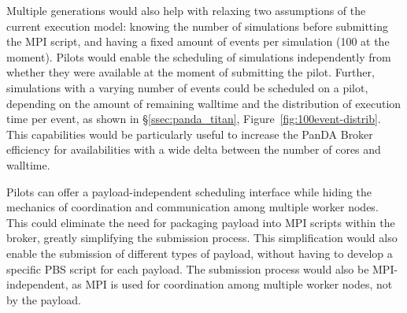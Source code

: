 Multiple generations would also help with relaxing two assumptions of the
current execution model: knowing the number of simulations before submitting the
MPI script, and having a fixed amount of events per simulation (100 at the
moment). Pilots would enable the scheduling of simulations independently from
whether they were available at the moment of submitting the pilot. Further,
simulations with a varying number of events could be scheduled on a pilot,
depending on the amount of remaining walltime and the distribution of execution
time per event, as shown in \S\ref{ssec:panda_titan},
Figure~\ref{fig:100event-distrib}. This capabilities would be particularly
useful to increase the PanDA Broker efficiency for availabilities with a wide
delta between the number of cores and walltime.



Pilots can offer a payload-independent scheduling interface while hiding the
mechanics of coordination and communication among multiple worker nodes. This
could eliminate the need for packaging payload into MPI scripts within the
broker, greatly simplifying the submission process. This simplification would
also enable the submission of different types of payload, without having to
develop a specific PBS script for each payload. The submission process would
also be MPI-independent, as MPI is used for coordination among multiple worker
nodes, not by the payload.


